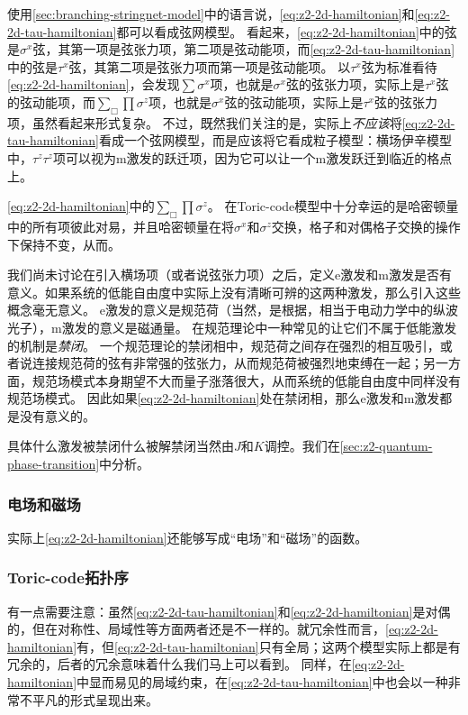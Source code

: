 使用\autoref{sec:branching-stringnet-model}中的语言说，\eqref{eq:z2-2d-hamiltonian}和\eqref{eq:z2-2d-tau-hamiltonian}都可以看成弦网模型。
看起来，\eqref{eq:z2-2d-hamiltonian}中的弦是$\sigma^x$弦，其第一项是弦张力项，第二项是弦动能项，而\eqref{eq:z2-2d-tau-hamiltonian}中的弦是$\tau^x$弦，其第二项是弦张力项而第一项是弦动能项。
以$\tau^x$弦为标准看待\eqref{eq:z2-2d-hamiltonian}，会发现$\sum \sigma^x$项，也就是$\sigma^x$弦的弦张力项，实际上是$\tau^x$弦的弦动能项，而$\sum_\Box \prod \sigma^z$项，也就是$\sigma^x$弦的弦动能项，实际上是$\tau^x$弦的弦张力项，虽然看起来形式复杂。
不过，既然我们关注的是，实际上\emph{不应该}将\eqref{eq:z2-2d-tau-hamiltonian}看成一个弦网模型，而是应该将它看成粒子模型：横场伊辛模型中，$\tau^z \tau^z$项可以视为m激发的跃迁项，因为它可以让一个m激发跃迁到临近的格点上。

\eqref{eq:z2-2d-hamiltonian}中的$\sum_\Box \prod \sigma^z$。
在Toric-code模型中十分幸运的是哈密顿量中的所有项彼此对易，并且哈密顿量在将$\sigma^x$和$\sigma^z$交换，格子和对偶格子交换的操作下保持不变，从而。%

我们尚未讨论在引入横场项（或者说弦张力项）之后，定义e激发和m激发是否有意义。如果系统的低能自由度中实际上没有清晰可辨的这两种激发，那么引入这些概念毫无意义。
e激发的意义是规范荷（当然，是根据，相当于电动力学中的纵波光子），m激发的意义是磁通量。
在规范理论中一种常见的让它们不属于低能激发的机制是\emph{禁闭}。
一个规范理论的禁闭相中，规范荷之间存在强烈的相互吸引，或者说连接规范荷的弦有非常强的弦张力，从而规范荷被强烈地束缚在一起；另一方面，规范场模式本身期望不大而量子涨落很大，从而系统的低能自由度中同样没有规范场模式。
因此如果\eqref{eq:z2-2d-hamiltonian}处在禁闭相，那么e激发和m激发都是没有意义的。

具体什么激发被禁闭什么被解禁闭当然由$J$和$K$调控。我们在\autoref{sec:z2-quantum-phase-transition}中分析。

\subsubsection{电场和磁场}

实际上\eqref{eq:z2-2d-hamiltonian}还能够写成\Ztwo“电场”和“磁场”的函数。

\subsubsection{Toric-code拓扑序}\label{sec:z2-topo-excitation}

有一点需要注意：虽然\eqref{eq:z2-2d-tau-hamiltonian}和\eqref{eq:z2-2d-hamiltonian}是对偶的，但在对称性、局域性等方面两者还是不一样的。就冗余性而言，\eqref{eq:z2-2d-hamiltonian}有，但\eqref{eq:z2-2d-tau-hamiltonian}只有全局；这两个模型实际上都是有冗余的，后者的冗余意味着什么我们马上可以看到。
同样，在\eqref{eq:z2-2d-hamiltonian}中显而易见的局域约束，在\eqref{eq:z2-2d-tau-hamiltonian}中也会以一种非常不平凡的形式呈现出来。

